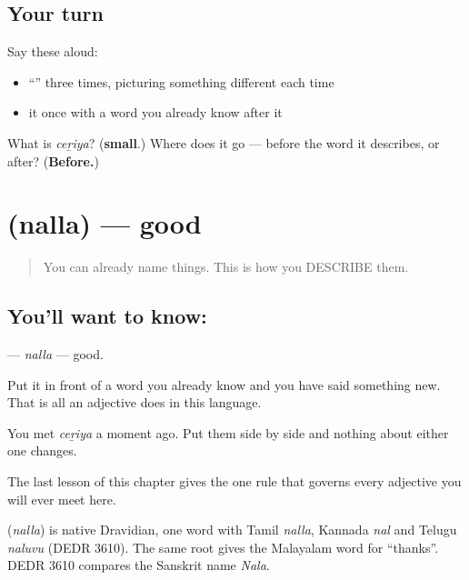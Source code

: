 \subsection*{Your turn}
Say these aloud:

\begin{itemize}
\raggedright
  \item \textquotedblleft{}\textquotedblright{} three times, picturing something different each time
  \item it once with a word you already know after it
\end{itemize}

\begin{tcolorbox}[breakable,colback=teal!4,colframe=teal!35!black,title={Before you move on}]
What is \emph{ceṟiya}? (\textbf{small}.) Where does it go — before the word it describes, or after? (\textbf{Before.})
\end{tcolorbox}
\section[\texorpdfstring{\ml{നല്ല} (nalla)}{നല്ല (nalla)}]{ (nalla) — good}

\label{lesson:ML-C42-good}



\begin{quote}
You can already name things. This is how you DESCRIBE them.
\end{quote}

\subsection*{You'll want to know: }
\textbf{} — \emph{nalla} — good.

Put it in front of a word you already know and you have said something new. That is all an adjective does in this language.

You met \textbf{} \emph{ceṟiya} a moment ago. Put them side by side and nothing about either one changes.

The last lesson of this chapter gives the one rule that governs every adjective you will ever meet here.

\begin{cousinweb}
\textbf{} (\emph{nalla}) is native Dravidian, one word with Tamil \emph{nalla}, Kannada \emph{nal} and Telugu \emph{naluvu} (DEDR 3610). The same root gives the Malayalam word for \textquotedblleft{}thanks\textquotedblright{}. DEDR 3610 compares the Sanskrit name \emph{Nala}.
\end{cousinweb}


